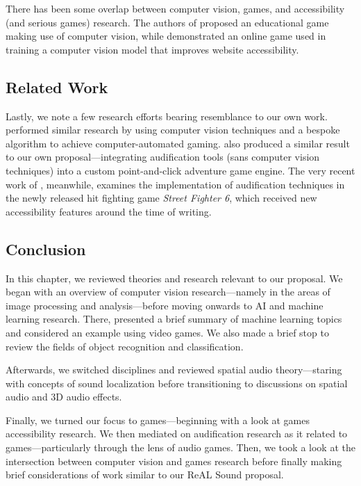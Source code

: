\documentclass{report}
\newcommand{\rs}{ReAL Sound\xspace}
\begin{document}
There has been some overlap between computer vision, games, and accessibility (and serious games) research. The authors of \cite{chursin2021using} proposed an educational game making use of computer vision, while \cite{webgame} demonstrated an online game used in training a computer vision model that improves website accessibility.

\subsection{Related Work}

Lastly, we note a few research efforts bearing resemblance to our own work. \cite{erdelyi2019using} performed similar research by using computer vision techniques and a bespoke algorithm to achieve computer-automated gaming. \cite{vallejo2011applying} also produced a similar result to our own proposal---integrating audification tools (sans computer vision techniques) into a custom point-and-click adventure game engine. The very recent work of \cite{StreetFighter}, meanwhile, examines the implementation of audification techniques in the newly released hit fighting game \emph{Street Fighter 6}, which received new accessibility features around the time of writing. 

\subsection{Conclusion}
In this chapter, we reviewed theories and research relevant to our proposal. We began with an overview of computer vision research---namely in the areas of image processing and analysis---before moving onwards to AI and machine learning research. There, presented a brief summary of machine learning topics and considered an example using video games. We also made a brief stop to review the fields of object recognition and classification.  

Afterwards, we switched disciplines and reviewed spatial audio theory---staring with concepts of sound localization before transitioning to discussions on spatial audio and 3D audio effects. 

Finally, we turned our focus to games---beginning with a look at games accessibility research. We then mediated on audification research as it related to games---particularly through the lens of audio games. Then, we took a look at the intersection between computer vision and games research before finally making brief considerations of work similar to our \rs proposal.
\end{document}
